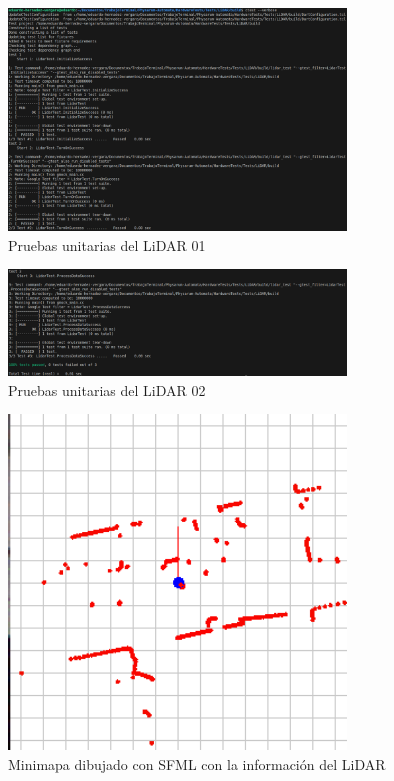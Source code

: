     \vskip 0.5cm
    \begin{figure}[htbp]
        \centering
        \includegraphics[width=0.8\textwidth]{./images/Pruebas/robot/PruebaLidar01-1.png}
        \caption{Pruebas unitarias del LiDAR 01}
        \label{fig:LidarTest1}
    \end{figure}
    \begin{figure}[htbp]
        \centering
        \includegraphics[width=0.8\textwidth]{./images/Pruebas/robot/PruebaLidar01-2.png}
        \caption{Pruebas unitarias del LiDAR 02}
        \label{fig:LidarTest2}
    \end{figure}
    \begin{figure}[htbp]
        \centering
        \includegraphics[width=0.8\textwidth]{./images/Pruebas/robot/LidarSFML01.png}
        \caption{Minimapa dibujado con SFML con la informaci\'on del LiDAR}
        \label{fig:LidarTest2}
    \end{figure}
    